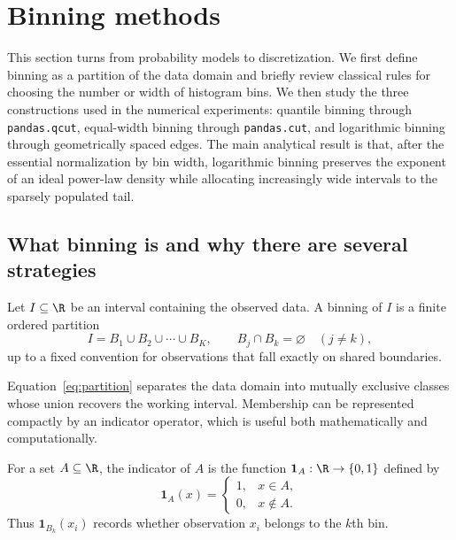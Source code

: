 \section{Binning methods}

This section turns from probability models to discretization. We first define binning as a partition of the data domain and briefly review classical rules for choosing the number or width of histogram bins. We then study the three constructions used in the numerical experiments: quantile binning through \texttt{pandas.qcut}, equal-width binning through \texttt{pandas.cut}, and logarithmic binning through geometrically spaced edges. The main analytical result is that, after the essential normalization by bin width, logarithmic binning preserves the exponent of an ideal power-law density while allocating increasingly wide intervals to the sparsely populated tail.

\subsection{What binning is and why there are several strategies}

\begin{definition}[Binning]
Let $I\subseteq\R$ be an interval containing the observed data. A binning of $I$ is a finite ordered partition
\begin{equation}
 I=B_1\cup B_2\cup\cdots\cup B_K,
 \qquad B_j\cap B_k=\varnothing\quad(j\neq k),
\label{eq:partition}
\end{equation}
up to a fixed convention for observations that fall exactly on shared boundaries.
\end{definition}

Equation~\eqref{eq:partition} separates the data domain into mutually exclusive classes whose union recovers the working interval. Membership can be represented compactly by an indicator operator, which is useful both mathematically and computationally.

\begin{definition}
For a set $A\subseteq\R$, the indicator of $A$ is the function $\mathbf{1}_A:\R\rightarrow\{0,1\}$ defined by
\[
\mathbf{1}_A(x)=
\begin{cases}
1, & x\in A,\\
0, & x\notin A.
\end{cases}
\]
Thus $\mathbf{1}_{B_k}(x_i)$ records whether observation $x_i$ belongs to the $k$th bin.
\end{definition}

